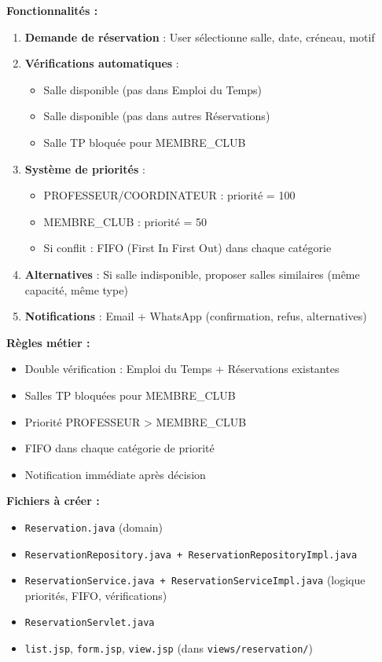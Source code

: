 \documentclass[11pt,a4paper]{article}
\begin{document}
\textbf{Fonctionnalités :}
\begin{enumerate}
    \item \textbf{Demande de réservation} : User sélectionne salle, date, créneau, motif
    \item \textbf{Vérifications automatiques} :
    \begin{itemize}
        \item Salle disponible (pas dans Emploi du Temps)
        \item Salle disponible (pas dans autres Réservations)
        \item Salle TP bloquée pour MEMBRE\_CLUB
    \end{itemize}
    \item \textbf{Système de priorités} :
    \begin{itemize}
        \item PROFESSEUR/COORDINATEUR : priorité = 100
        \item MEMBRE\_CLUB : priorité = 50
        \item Si conflit : FIFO (First In First Out) dans chaque catégorie
    \end{itemize}
    \item \textbf{Alternatives} : Si salle indisponible, proposer salles similaires (même capacité, même type)
    \item \textbf{Notifications} : Email + WhatsApp (confirmation, refus, alternatives)
\end{enumerate}

\textbf{Règles métier :}
\begin{itemize}
    \item Double vérification : Emploi du Temps + Réservations existantes
    \item Salles TP bloquées pour MEMBRE\_CLUB
    \item Priorité PROFESSEUR > MEMBRE\_CLUB
    \item FIFO dans chaque catégorie de priorité
    \item Notification immédiate après décision
\end{itemize}

\textbf{Fichiers à créer :}
\begin{itemize}
    \item \texttt{Reservation.java} (domain)
    \item \texttt{ReservationRepository.java + ReservationRepositoryImpl.java}
    \item \texttt{ReservationService.java + ReservationServiceImpl.java} (logique priorités, FIFO, vérifications)
    \item \texttt{ReservationServlet.java}
    \item \texttt{list.jsp}, \texttt{form.jsp}, \texttt{view.jsp} (dans \texttt{views/reservation/})
\end{itemize}
\end{document}
